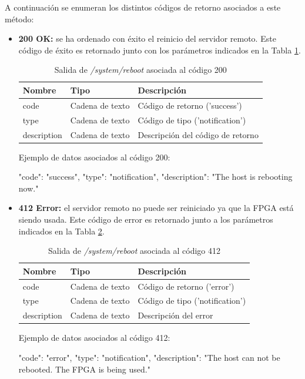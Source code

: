 A continuación se enumeran los distintos códigos de retorno asociados a este método:
\begin{itemize}

\item{\textbf{200 OK:} se ha ordenado con éxito el reinicio del servidor remoto. Este código de éxito es retornado junto con los parámetros indicados en la Tabla \ref{extra:api:reboot:ok}.
\begin{table}[H]
\centering
\begin{tabular}{|l|l|l|}
\hline
\rowcolor[HTML]{F5F5F5}
\textbf{Nombre}  & \textbf{Tipo}   & \textbf{Descripción}              \\ \hline
code             & Cadena de texto & Código de retorno ('success')     \\ \hline
type             & Cadena de texto & Código de tipo ('notification')   \\ \hline
description      & Cadena de texto & Descripción del código de retorno \\ \hline
\end{tabular}
\caption{Salida de \textit{/system/reboot} asociada al código 200}
\label{extra:api:reboot:ok}
\end{table}
\begin{minipage}{\textwidth}
Ejemplo de datos asociados al código 200:

\begin{code}[language=json]
{
  "code": "success",
  "type": "notification",
  "description": "The host is rebooting now."
}
\end{code}
\end{minipage}
}

\item{\textbf{412 Error:} el servidor remoto no puede ser reiniciado ya que la \gls{FPGA} está siendo usada. Este código de error es retornado junto a los parámetros indicados en la Tabla \ref{extra:api:reboot:error}.
\begin{table}[H]
\centering
\begin{tabular}{|l|l|l|}
\hline
\rowcolor[HTML]{F5F5F5}
\textbf{Nombre}  & \textbf{Tipo}   & \textbf{Descripción}            \\ \hline
code             & Cadena de texto & Código de retorno ('error')     \\ \hline
type             & Cadena de texto & Código de tipo ('notification') \\ \hline
description      & Cadena de texto & Descripción del error           \\ \hline
\end{tabular}
\caption{Salida de \textit{/system/reboot} asociada al código 412}
\label{extra:api:reboot:error}
\end{table}
\begin{minipage}{\textwidth}
Ejemplo de datos asociados al código 412:

\begin{code}[language=json]
{
  "code": "error",
  "type": "notification",
  "description": "The host can not be rebooted. The FPGA is being used."
}
\end{code}
\end{minipage}
}
\end{itemize}

